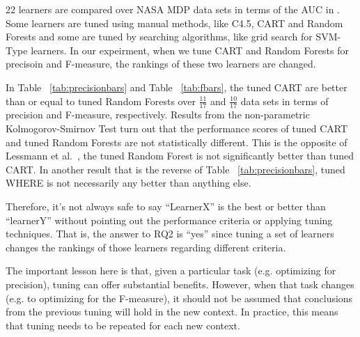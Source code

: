 \documentclass{sig-alternative}
\newcommand{\tab}[1]{Table ~\ref{tab:#1}}
\begin{document}
22 learners are compared over NASA MDP data sets in terms of the AUC in \cite{lessmann2008benchmarking}. Some learners are tuned using manual methods, like C4.5, CART and Random Forests and some are tuned by searching algorithms, like grid search for SVM-Type learners. In our expeirment, when we tune CART and Random Forests for precisoin and F-measure, the rankings of these two learners are changed.

In \tab{precisionbars} and \tab{fbars}, the tuned CART are better than or equal to tuned Random Forests over $\frac{11}{17}$ and $\frac{10}{17}$ data sets in
terms of precision and F-measure, respectively. Results from the non-parametric Kolmogorov-Smirnov Test turn out that the performance 
scores of tuned CART and tuned Random Forests are not statistically different. This is the opposite of   
 Lessmann et al.~\cite{lessmann2008benchmarking}, the tuned Random Forest is not significantly better than tuned CART.
 In another result that is the reverse of \tab{precisionbars}, tuned WHERE is not necessarily
 any better than anything else.
 
 Therefore, it's not always safe to say ``LearnerX'' is the best or better than ``learnerY'' without pointing out the performance criteria or applying tuning techniques. That is, the answer to RQ2 is ``yes'' since tuning a set of learners
 changes the rankings of those learners regarding different criteria.
 
The  important lesson here is that, given a particular task (e.g. optimizing for precision), tuning can offer
substantial benefits. However, when that task changes (e.g. to optimizing for the F-measure),
it should not be assumed that conclusions from the previous tuning will hold in the new context.
In practice, this means that tuning needs to be repeated for each new context.


\end{document}
